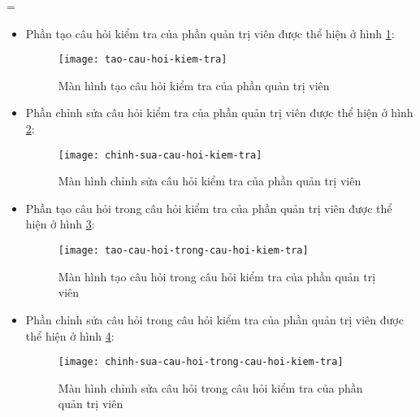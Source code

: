 =\documentclass[../Thesis.tex]{subfiles}
\begin{document}
\begin{itemize}
                \item Phần tạo câu hỏi kiểm tra của phần quản trị viên được thể hiện ở hình \ref{fig:tao-cau-hoi-kiem-tra}:
                \begin{figure}[hbt!]
                    \centering\texttt{[image: tao-cau-hoi-kiem-tra]}
                    \caption{Màn hình tạo câu hỏi kiểm tra của phần quản trị viên}
                    \label{fig:tao-cau-hoi-kiem-tra}
                \end{figure}
                \FloatBarrier

                \item Phần chỉnh sửa câu hỏi kiểm tra của phần quản trị viên được thể hiện ở hình \ref{fig:chinh-sua-cau-hoi-kiem-tra}:
                \begin{figure}[hbt!]
                    \centering\texttt{[image: chinh-sua-cau-hoi-kiem-tra]}
                    \caption{Màn hình chỉnh sửa câu hỏi kiểm tra của phần quản trị viên}
                    \label{fig:chinh-sua-cau-hoi-kiem-tra}
                \end{figure}
                \FloatBarrier

                \item Phần tạo câu hỏi trong câu hỏi kiểm tra của phần quản trị viên được thể hiện ở hình \ref{fig:tao-cau-hoi-trong-cau-hoi-kiem-tra}:
                \begin{figure}[hbt!]
                    \centering\texttt{[image: tao-cau-hoi-trong-cau-hoi-kiem-tra]}
                    \caption{Màn hình tạo câu hỏi trong câu hỏi kiểm tra của phần quản trị viên}
                    \label{fig:tao-cau-hoi-trong-cau-hoi-kiem-tra}
                \end{figure}
                \FloatBarrier

                \item Phần chỉnh sửa câu hỏi trong câu hỏi kiểm tra của phần quản trị viên được thể hiện ở hình \ref{fig:chinh-sua-cau-hoi-trong-cau-hoi-kiem-tra}:
                \begin{figure}[hbt!]
                    \centering\texttt{[image: chinh-sua-cau-hoi-trong-cau-hoi-kiem-tra]}
                    \caption{Màn hình chỉnh sửa câu hỏi trong câu hỏi kiểm tra của phần quản trị viên}
                    \label{fig:chinh-sua-cau-hoi-trong-cau-hoi-kiem-tra}
                \end{figure}
                \FloatBarrier


\end{itemize}
\end{document}
